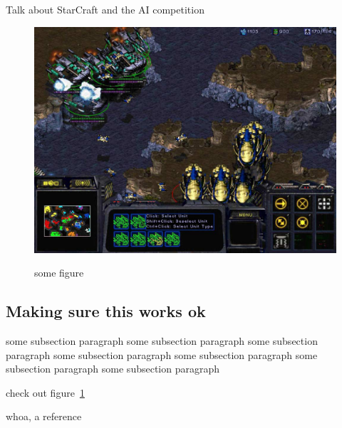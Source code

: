 Talk about StarCraft and the AI competition

\begin{figure}
\centering
\includegraphics[scale=0.4, trim = 0cm 0cm 0cm 0cm]{images/test}
\label{fig:test}
\caption{some figure}
\end{figure}

\subsection{Making sure this works ok}

some subsection paragraph some subsection paragraph some subsection paragraph some subsection paragraph some subsection paragraph some subsection paragraph some subsection paragraph

check out figure~\ref{fig:test}

whoa, a reference~\cite{gershenfeld1999nature}